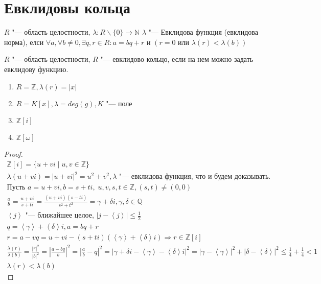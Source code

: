 \section{Евклидовы кольца}

\begin{Def}
$R$ "--- область целостности, $\lambda\colon R\smallsetminus\{0\} \to \mathbb{N}$ 
$\lambda$ "--- Евклидова функция (евклидова норма), елси $\forall a, \forall b \neq 0, \exists q, r \in R \colon a = bq + r$ и 
$\left(r = 0 \text{ или } \lambda\left(r\right) < \lambda\left(b\right)\right)$
\end{Def}

\begin{Def}
	$R$ "--- область целостности, $R$ "--- евклидово кольцо, если на нем можно задать евклидову функцию.
\end{Def}

\begin{exmp}
	\begin{enumerate}
		\item $R = \mathbb{Z}, \lambda\left(r\right) = |x|$
		\item $R = K\left[x\right], \lambda = deg\left(g\right), K$ "--- поле
		\item $\mathbb{Z}\left[i\right]$
		\item $\mathbb{Z}\left[\omega\right]$
	\end{enumerate}
\end{exmp}

\begin{proof}
	\begin{gather*}
		\mathbb{Z}\left[i\right] = \{u + vi \mid u, v \in \mathbb{Z}\} \\
		\lambda\left(u + vi\right) = |u + vi|^{2} = u^{2} + v^{2}, \lambda \text{ "--- евклидова функция, что и будем доказывать.} \\
		\text{Пусть } a = u + vi, b = s + ti, \; u,v,s,t \in \mathbb{Z}, \left(s, t\right) \neq \left(0, 0\right) \\
		\frac{a}{b} = \frac{u + vi}{s + ti} = \frac{\left(u + vi\right)\left(s - ti\right)}{s^{2} + t^{2}} = \gamma + \delta i, 
		\gamma, \delta \in \mathbb{Q} \\
		\left<j\right> \text{ "--- ближайшее целое, } |j - \left<j\right>| \leq \frac{1}{2} \\
		q = \left<\gamma\right> + \left<\delta\right>i, a = bq + r\\
		r = a - vq = u + vi - \left(s + ti\right)\left(\left<\gamma\right> + \left<\delta\right>i\right) 
		\Rightarrow r \in \mathbb{Z}\left[i\right] \\
		\frac{\lambda\left(r\right)}{\lambda\left(b\right)} = \frac{|r|^{2}}{|b|^{2}} = \left|\frac{a - bq}{b}\right|^{2} = 
		\left|\frac{a}{b} - q\right|^{2} = \left|\gamma + \delta i - \left<\gamma\right> - \left<\delta\right>i \right|^{2} = 
		\left| \gamma - \left<\gamma\right>\right|^{2} + \left|\delta - \left<\delta\right>\right|^{2} \leq \frac{1}{4} + \frac{1}{4} < 1\\
		\lambda\left(r\right) < \lambda\left(b\right)
		\end{gather*}
\end{proof}

